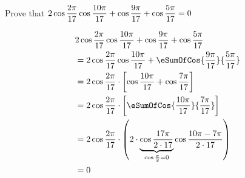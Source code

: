 




\question[4] Prove that $2\cos\dfrac{2\pi}{17}\cos\dfrac{10\pi}{17} + 
\cos\dfrac{9\pi}{17} + \cos\dfrac{5\pi}{17} = 0 $

\watchout

\ifprintanswers
\fi 

\begin{solution}[\halfpage]
     \begin{align}
     	&2\cos\dfrac{\vbfive\pi}{\vbone}\cos\dfrac{\vbtwo\pi}{\vbone} + 
     	\cos\dfrac{\vbthree\pi}{\vbone} + \cos\dfrac{\vbfour\pi}{\vbone} \nonumber \\
     	&= 2\cos\dfrac{\vbfive\pi}{\vbone}\cos\dfrac{\vbtwo\pi}{\vbone} + 
     	\eSumOfCos{\frac{\vbthree\pi}{\vbone}}{\frac{\vbfour\pi}{\vbone}} \\
     	&= 2\cos\dfrac{\vbfive\pi}{\vbone}\cdot\left[ \cos\dfrac{\vbtwo\pi}{\vbone} + \cos\dfrac{\vbsix\pi}{\vbone}\right] \\
     	&= 2\cos\dfrac{\vbfive\pi}{\vbone}\cdot\left[ \eSumOfCos{\frac{\vbtwo\pi}{\vbone}}{\frac{\vbsix\pi}{\vbone}} \right] \\
     	&= 2\cos\dfrac{\vbfive\pi}{\vbone}\cdot
     	\left( 2\cdot\underbrace{\cos\dfrac{\vbone\pi}{2\cdot\vbone}}_{\cos\frac{\pi}{2} = 0}
     	\cos\dfrac{\vbtwo\pi-\vbsix\pi}{2\cdot\vbone}\right) \\
        &= 0
     \end{align}
\end{solution}
